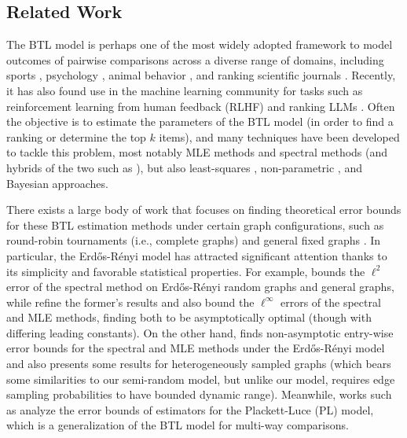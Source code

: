 \documentclass[sigconf,nonacm,pbalance]{acmart}
\begin{document}
\subsection{Related Work}
The BTL model \cite{BradleyTerry1952,Luce1959,Plackett1975,Zermelo1929} is perhaps one of the most widely adopted framework to model outcomes of pairwise comparisons across a diverse range of domains, including sports \cite{barry1993choice,Massey1997,cattelan2013dynamic,JadbabaieMakurShah2020}, psychology \cite{Matthews2018pain}, animal behavior \cite{Adams2005}, and ranking scientific journals \cite{Stigler1994}. Recently, it has also found use in the machine learning community for tasks such as reinforcement learning from human feedback (RLHF) \cite{ChristianoLeikeBrown2017,OuyangWuJiang2022} and ranking LLMs \cite{Chiangetal2024}. Often the objective is to estimate the parameters of the BTL model (in order to find a ranking or determine the top $k$ items), and many techniques have been developed to tackle this problem, most notably MLE methods \cite{Ford1957,Hunter2004,Shahetal2016,Zermelo1929,SimonsYao1999} and spectral methods \cite{NegahbanOhShah2017, JadbabaieMakurShah2020,SpectralonGeneralMultiway} (and hybrids of the two such as \cite{ChenSuh2015}), but also least-squares \cite{HendrickxOlshevskySaligrama2020}, non-parametric \cite{BongLiShrotriyaRinaldo2020,Chatterjee2015}, and Bayesian \cite{GuiverSnelson2009,Adams2005,CaronDoucet2012} approaches.

There exists a large body of work that focuses on finding theoretical error bounds for these BTL estimation methods under certain graph configurations, such as round-robin tournaments (i.e., complete graphs) \cite{SimonsYao1999} and general fixed graphs \cite{NegahbanOhShah2017,LiShrotriyaRinaldo2022,SpectralonGeneralMultiway,RankingGeneralGraphsLocality}. In particular, the Erd\H{o}s-R\'{e}nyi model has attracted significant attention thanks to its simplicity and favorable statistical properties. For example, \cite{NegahbanOhShah2017} bounds the $\ell^2$ error of the spectral method on Erd\H{o}s-R\'{e}nyi random graphs and general graphs, while \cite{Chenetal2019,ChenGaoZhang2022} refine the former's results and also bound the $\ell^\infty$ errors of the spectral and MLE methods, finding both to be asymptotically optimal (though with differing leading constants). On the other hand,  \cite{UncertaintyQuantificationBTL} finds non-asymptotic entry-wise error bounds for the spectral and MLE methods under the Erd\H{o}s-R\'{e}nyi model and also presents some results for heterogeneously sampled graphs (which bears some similarities to our semi-random model, but unlike our model, requires edge sampling probabilities to have bounded dynamic range). Meanwhile, works such as \cite{SpectralonGeneralMultiway,UncertaintyQuantificationMultiway,JangKimSuh2018} analyze the error bounds of estimators for the Plackett-Luce (PL) model, which is a generalization of the BTL model for multi-way comparisons.  
\end{document}
